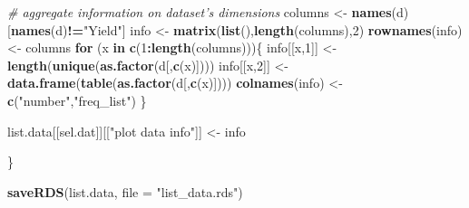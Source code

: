 \documentclass[]{article}
\newenvironment{Shaded}{\begin{snugshade}}{\end{snugshade}}
\newcommand{\KeywordTok}[1]{\textcolor[rgb]{0.13,0.29,0.53}{\textbf{#1}}}
\newcommand{\DataTypeTok}[1]{\textcolor[rgb]{0.13,0.29,0.53}{#1}}
\newcommand{\DecValTok}[1]{\textcolor[rgb]{0.00,0.00,0.81}{#1}}
\newcommand{\StringTok}[1]{\textcolor[rgb]{0.31,0.60,0.02}{#1}}
\newcommand{\CommentTok}[1]{\textcolor[rgb]{0.56,0.35,0.01}{\textit{#1}}}
\newcommand{\ControlFlowTok}[1]{\textcolor[rgb]{0.13,0.29,0.53}{\textbf{#1}}}
\newcommand{\OperatorTok}[1]{\textcolor[rgb]{0.81,0.36,0.00}{\textbf{#1}}}
\newcommand{\NormalTok}[1]{#1}
\begin{document}
\begin{Shaded}
\begin{Highlighting}[]
  \CommentTok{# aggregate information on dataset's dimensions}
\NormalTok{    columns <-}\StringTok{ }\KeywordTok{names}\NormalTok{(d)[}\KeywordTok{names}\NormalTok{(d)}\OperatorTok{!=}\StringTok{"Yield"}\NormalTok{]}
\NormalTok{    info    <-}\StringTok{ }\KeywordTok{matrix}\NormalTok{(}\KeywordTok{list}\NormalTok{(),}\KeywordTok{length}\NormalTok{(columns),}\DecValTok{2}\NormalTok{)}
    \KeywordTok{rownames}\NormalTok{(info) <-}\StringTok{ }\NormalTok{columns}
    \ControlFlowTok{for}\NormalTok{ (x }\ControlFlowTok{in} \KeywordTok{c}\NormalTok{(}\DecValTok{1}\OperatorTok{:}\KeywordTok{length}\NormalTok{(columns)))\{}
\NormalTok{      info[[x,}\DecValTok{1}\NormalTok{]] <-}\StringTok{    }\KeywordTok{length}\NormalTok{(}\KeywordTok{unique}\NormalTok{(}\KeywordTok{as.factor}\NormalTok{(d[,}\KeywordTok{c}\NormalTok{(x)])))}
\NormalTok{      info[[x,}\DecValTok{2}\NormalTok{]] <-}\StringTok{ }\KeywordTok{data.frame}\NormalTok{(}\KeywordTok{table}\NormalTok{(}\KeywordTok{as.factor}\NormalTok{(d[,}\KeywordTok{c}\NormalTok{(x)])))}
      \KeywordTok{colnames}\NormalTok{(info) <-}\StringTok{ }\KeywordTok{c}\NormalTok{(}\StringTok{"number"}\NormalTok{,}\StringTok{"freq_list"}\NormalTok{)}
\NormalTok{    \}}
    
\NormalTok{  list.data[[sel.dat]][[}\StringTok{"plot data info"}\NormalTok{]] <-}\StringTok{ }\NormalTok{info}

\NormalTok{\}}

\KeywordTok{saveRDS}\NormalTok{(list.data, }\DataTypeTok{file =} \StringTok{"list_data.rds"}\NormalTok{)}
\end{Highlighting}
\end{Shaded}
\end{document}
